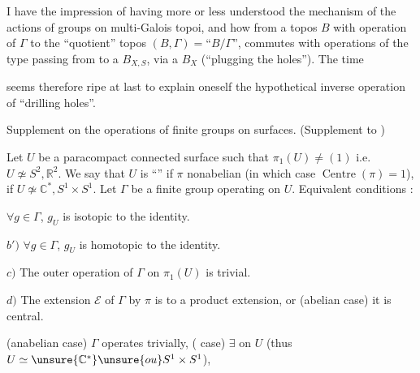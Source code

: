 I have the impression of having more or less
understood the mechanism of the actions of
groups on multi-Galois topoi,
and how 
from a topos $B$ with operation of $\Gamma$
to the ``quotient'' topos $(B,\Gamma)=\text{``}B/\Gamma\text{''}$,
commutes with operations of the type
passing from
to a $B_{X,S}$, via a
$B_X$ (``plugging the holes'').  The time


seems therefore ripe at last to explain oneself
 the hypothetical inverse operation
of ``drilling  holes''.

 Supplement on the operations of finite groups
on surfaces. (Supplement to )

Let $U$ be a paracompact connected surface \unsure{!}
such that $\pi_1(U)\ne(1)$ i.e. $U\not\simeq S^2,\mathbb R^2$.
We say that $U$ is ``'' if
$\pi$ nonabelian (in which case $\operatorname{Centre}(\pi)=1$),
 if $U\not\simeq\mathbb C^*,S^1\times S^1$.
Let $\Gamma$
be a finite group operating on $U$. Equivalent
conditions :

  $\forall g\in\Gamma$, $g_U$ is isotopic to the identity.

$b')$ $\forall g\in\Gamma$, $g_U$ is homotopic to the identity.

$c)$ The outer operation of $\Gamma$ on
$\pi_1(U)$ is trivial.

$d)$  The extension $\mathcal E$ of $\Gamma$ by $\pi$ is
 to a product extension, or (abelian case)
 it is central.

 (anabelian case) $\Gamma$ operates trivially,
( case) $\exists$ 
on $U$ (thus $U\simeq\unsure{\mathbb C^*} \unsure{ou} S^1\times S^1$),
\deleted{[more intrinsically $U=(\pi\otimes_{\mathbb Z}\unsure{\mathbb C})/\pi$
\illegible{4}]}

